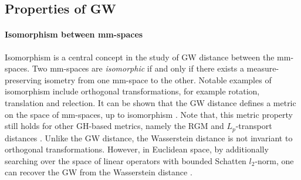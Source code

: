 \subsection{Properties of GW} \label{subsec:prop_gw}
\paragraph{Isomorphism between mm-spaces}
Isomorphism is a central concept in the study of GW distance between the mm-spaces.
Two mm-spaces are \textit{isomorphic}
if and only if there exists a measure-preserving isometry from
one mm-space to the other. Notable examples of isomorphism include orthogonal transformations,
for example rotation, translation and relection.
It can be shown that the GW distance defines a metric on the space of mm-spaces,
up to isomorphism \citep{Memoli07,Sturm12}.
Note that, this metric property still holds for other GH-based metrics,
namely the RGM and $L_p$-transport distances \citep{Sturm06,Hur21}. Unlike the GW distance,
the Wasserstein distance is not invariant to orthogonal transformations. However,
in Euclidean space, by additionally searching over the space of linear operators with
bounded Schatten $l_2$-norm, one can recover the GW from the Wasserstein distance \citep{Melis19}.

